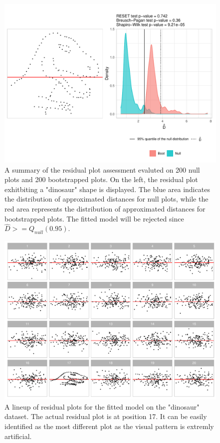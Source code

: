 \documentclass[]{interact}
\theoremstyle{plain}%
\theoremstyle{definition}
\theoremstyle{remark}
\begin{document}
\begin{figure}[!h]

{\centering \includegraphics[width=1\linewidth]{paper_files/figure-latex/dino-check-1} 

}

\caption{A summary of the residual plot assessment evaluted on 200 null plots and 200 bootstrapped plots. On the left, the residual plot exhitbiting a "dinosaur" shape is displayed. The blue area indicates the distribution of approximated distances for null plots, while the red area represents the distribution of approximated distances for bootstrapped plots. The fitted model will be rejected since $\hat{D} >= Q_{null}(0.95)$.}\label{fig:dino-check}
\end{figure}

\begin{figure}[!h]

{\centering \includegraphics[width=1\linewidth]{paper_files/figure-latex/dino-lineup-1} 

}

\caption{A lineup of residual plots for the fitted model on the "dinosaur" dataset. The actual residual plot is at position 17. It can be easily identified as the most different plot as the visual pattern is extremly artificial.}\label{fig:dino-lineup}
\end{figure}
\end{document}
